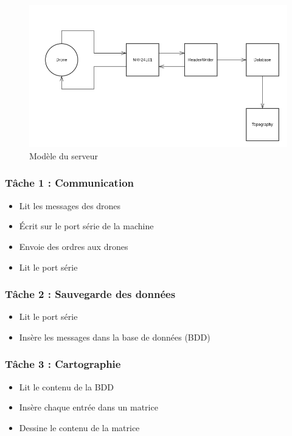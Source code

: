 \documentclass{beamer}
\begin{document}
{	\begin{frame} %
	  \begin{figure}[htbp]
	    \centering
	    \includegraphics[scale=0.3]{img/server_model.png}
	    \caption{Modèle du serveur}
	  \end{figure}  
	\end{frame}

	\begin{frame} %
	  \frametitle{Tâche 1 : Communication}
	
	  \begin{itemize}
	    \item Lit les messages des drones
	    \item Écrit sur le port série de la machine
	    \item Envoie des ordres aux drones
	    \item Lit le port série
	  \end{itemize}
	\end{frame}
	
	\begin{frame} %
	  \frametitle{Tâche 2 : Sauvegarde des données}
	
	  \begin{itemize}
	   \item Lit le port série
	   \item Insère les messages dans la base de données (BDD)
	  \end{itemize}
	\end{frame}
	
	\begin{frame} %
	  \frametitle{Tâche 3 : Cartographie}
	
	  \begin{itemize}
	    \item Lit le contenu de la BDD
	    \item Insère chaque entrée dans un matrice
	    \item Dessine le contenu de la matrice
	  \end{itemize}
	\end{frame}

}
\end{document}
